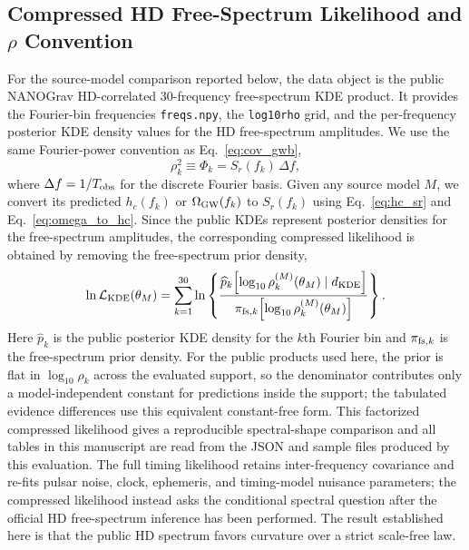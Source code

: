 \documentclass[symmetry,article,submit,pdftex,moreauthors]{Definitions/mdpi}
\begin{document}
\subsection{Compressed HD Free-Spectrum Likelihood and \texorpdfstring{$\rho$}{rho} Convention}\label{subsec:kde_likelihood}
For the source-model comparison reported below, the data object is the public NANOGrav HD-correlated 30-frequency free-spectrum KDE product. It provides the Fourier-bin frequencies \texttt{freqs.npy}, the \texttt{log10rho} grid, and the per-frequency posterior KDE density values for the HD free-spectrum amplitudes. We use the same Fourier-power convention as Eq.~\eqref{eq:cov_gwb},
\begin{equation}\label{eq:rho_convention}
    \rho_k^2 \equiv \Phi_k = S_r(f_k)\,\Delta f ,
\end{equation}
where $\Delta f=1/T_{\rm obs}$ for the discrete Fourier basis. Given any source model $M$, we convert its predicted $h_c(f_k)$ or $\Omega_{\rm GW}(f_k)$ to $S_r(f_k)$ using Eq.~\eqref{eq:hc_sr} and Eq.~\eqref{eq:omega_to_hc}. Since the public KDEs represent posterior densities for the free-spectrum amplitudes, the corresponding compressed likelihood is obtained by removing the free-spectrum prior density,
\begin{equation}\label{eq:kde_likelihood}
    \ln \mathcal{L}_{\rm KDE}(\theta_M)
    =
    \sum_{k=1}^{30}
    \ln \left\{
    \frac{
    \widehat p_k\!\left[
        \log_{10}\rho_k^{(M)}(\theta_M)\mid d_{\rm KDE}
    \right]}
    {\pi_{{\rm fs},k}\!\left[
        \log_{10}\rho_k^{(M)}(\theta_M)
    \right]}
    \right\}.
\end{equation}
Here $\widehat p_k$ is the public posterior KDE density for the $k$th Fourier bin and $\pi_{{\rm fs},k}$ is the free-spectrum prior density. For the public products used here, the prior is flat in $\log_{10}\rho_k$ across the evaluated support, so the denominator contributes only a model-independent constant for predictions inside the support; the tabulated evidence differences use this equivalent constant-free form. This factorized compressed likelihood gives a reproducible spectral-shape comparison and all tables in this manuscript are read from the JSON and sample files produced by this evaluation. The full timing likelihood retains inter-frequency covariance and re-fits pulsar noise, clock, ephemeris, and timing-model nuisance parameters; the compressed likelihood instead asks the conditional spectral question after the official HD free-spectrum inference has been performed. The result established here is that the public HD spectrum favors curvature over a strict scale-free law.
\end{document}
